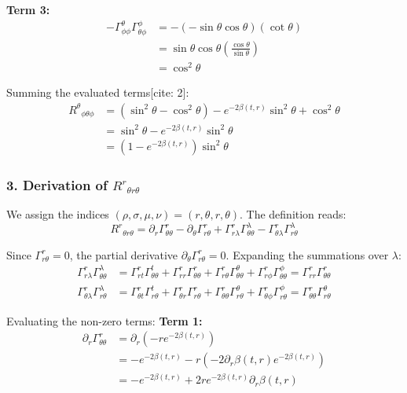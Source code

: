 \documentclass[11pt, a4paper]{report}
\begin{document}
\textbf{Term 3:}
\begin{align}
    -\Gamma^\theta_{\phi\phi}\Gamma^\phi_{\theta\phi} &= - \left( -\sin\theta \cos\theta \right) \left( \cot\theta \right) \nonumber \\
    &= \sin\theta \cos\theta \left( \frac{\cos\theta}{\sin\theta} \right) \nonumber \\
    &= \cos^2\theta
\end{align}

Summing the evaluated terms[cite: 2]:
\begin{align}
    {R^\theta}_{\phi\theta\phi} &= (\sin^2\theta - \cos^2\theta) - e^{-2\beta(t,r)} \sin^2\theta + \cos^2\theta \nonumber \\
    &= \sin^2\theta - e^{-2\beta(t,r)} \sin^2\theta \nonumber \\
    &= (1 - e^{-2\beta(t,r)}) \sin^2\theta
\end{align}

\subsubsection*{3. Derivation of ${R^r}_{\theta r\theta}$}

We assign the indices $(\rho, \sigma, \mu, \nu) = (r, \theta, r, \theta)$. The definition reads:
\begin{equation}
    {R^r}_{\theta r\theta} = \partial_r \Gamma^r_{\theta\theta} - \partial_\theta \Gamma^r_{r\theta} + \Gamma^r_{r\lambda}\Gamma^\lambda_{\theta\theta} - \Gamma^r_{\theta\lambda}\Gamma^\lambda_{r\theta}
\end{equation}

Since $\Gamma^r_{r\theta} = 0$, the partial derivative $\partial_\theta \Gamma^r_{r\theta} = 0$. 
Expanding the summations over $\lambda$:
\begin{align}
    \Gamma^r_{r\lambda}\Gamma^\lambda_{\theta\theta} &= \Gamma^r_{rt}\Gamma^t_{\theta\theta} + \Gamma^r_{rr}\Gamma^r_{\theta\theta} + \Gamma^r_{r\theta}\Gamma^\theta_{\theta\theta} + \Gamma^r_{r\phi}\Gamma^\phi_{\theta\theta} = \Gamma^r_{rr}\Gamma^r_{\theta\theta} \\
    \Gamma^r_{\theta\lambda}\Gamma^\lambda_{r\theta} &= \Gamma^r_{\theta t}\Gamma^t_{r\theta} + \Gamma^r_{\theta r}\Gamma^r_{r\theta} + \Gamma^r_{\theta\theta}\Gamma^\theta_{r\theta} + \Gamma^r_{\theta\phi}\Gamma^\phi_{r\theta} = \Gamma^r_{\theta\theta}\Gamma^\theta_{r\theta}
\end{align}

Evaluating the non-zero terms:
\textbf{Term 1:}
\begin{align}
    \partial_r \Gamma^r_{\theta\theta} &= \partial_r \left( -r e^{-2\beta(t,r)} \right) \nonumber \\
    &= -e^{-2\beta(t,r)} - r \left( -2 \partial_r \beta(t,r) e^{-2\beta(t,r)} \right) \nonumber \\
    &= -e^{-2\beta(t,r)} + 2r e^{-2\beta(t,r)} \partial_r \beta(t,r)
\end{align}
\end{document}
